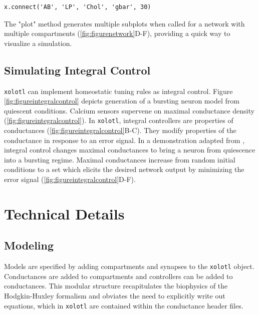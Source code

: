 \documentclass{frontiersSCNS} %
\begin{document}
\begin{lstlisting}[style=Matlab-editor]
	x.connect('AB', 'LP', 'Chol', 'gbar', 30)
\end{lstlisting}

The "plot" method generates multiple subplots when called for a network with multiple compartments (\ref{fig:figurenetwork}D-F), providing a quick way to visualize a simulation.

%
%
%
%
%
%

\subsection{Simulating Integral Control}

\texttt{xolotl} can implement homeostatic tuning rules as integral control. Figure \ref{fig:figureintegralcontrol} depicts generation of a bursting neuron model from quiescent conditions. Calcium sensors supervene on maximal conductance density (\ref{fig:figureintegralcontrol}). In \texttt{xolotl}, integral controllers are properties of conductances (\ref{fig:figureintegralcontrol}B-C). They modify properties of the conductance in response to an error signal. In a demonstration adapted from \cite{olearyCorrelationsIonChannel2013}, integral control changes maximal conductances to bring a neuron from quiescence into a bursting regime. Maximal conductances increase from random initial conditions to a set which elicits the desired network output by minimizing the error signal (\ref{fig:figureintegralcontrol}D-F).

%
%
%
%
%
%


\section{Technical Details}

\subsection{Modeling}

Models are specified by adding compartments and synapses to the \texttt{xolotl} object. Conductances are added to compartments and controllers can be added to conductances. This modular structure recapitulates the biophysics of the Hodgkin-Huxley formalism and obviates the need to explicitly write out equations, which in \texttt{xolotl} are contained within the conductance header files.
\end{document}
